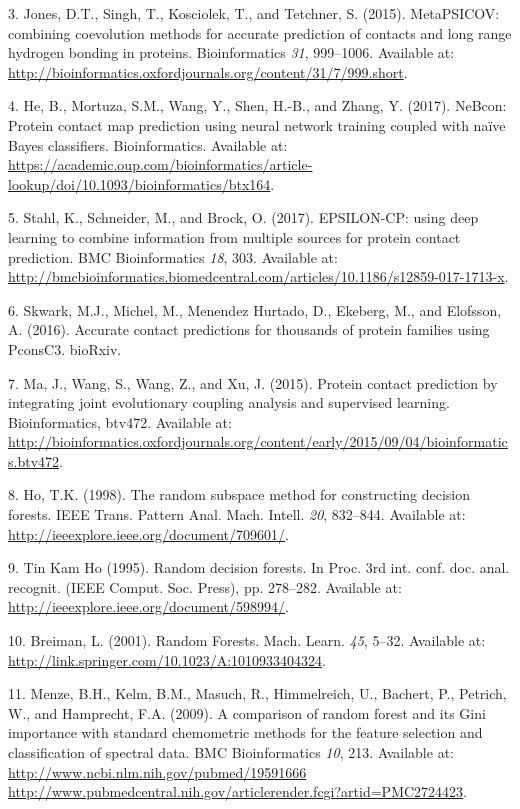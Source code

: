 \documentclass[12pt,a4paper,twoside]{book}
\theoremstyle{definition}
\theoremstyle{definition}
\theoremstyle{remark}
\begin{document}
\hypertarget{ref-Jones2015a}{}
3. Jones, D.T., Singh, T., Kosciolek, T., and Tetchner, S. (2015).
MetaPSICOV: combining coevolution methods for accurate prediction of
contacts and long range hydrogen bonding in proteins. Bioinformatics
\emph{31}, 999--1006. Available at:
\url{http://bioinformatics.oxfordjournals.org/content/31/7/999.short}.

\hypertarget{ref-He2017}{}
4. He, B., Mortuza, S.M., Wang, Y., Shen, H.-B., and Zhang, Y. (2017).
NeBcon: Protein contact map prediction using neural network training
coupled with naïve Bayes classifiers. Bioinformatics. Available at:
\url{https://academic.oup.com/bioinformatics/article-lookup/doi/10.1093/bioinformatics/btx164}.

\hypertarget{ref-Stahl2017}{}
5. Stahl, K., Schneider, M., and Brock, O. (2017). EPSILON-CP: using
deep learning to combine information from multiple sources for protein
contact prediction. BMC Bioinformatics \emph{18}, 303. Available at:
\url{http://bmcbioinformatics.biomedcentral.com/articles/10.1186/s12859-017-1713-x}.

\hypertarget{ref-Skwark2016}{}
6. Skwark, M.J., Michel, M., Menendez Hurtado, D., Ekeberg, M., and
Elofsson, A. (2016). Accurate contact predictions for thousands of
protein families using PconsC3. bioRxiv.

\hypertarget{ref-Ma2015a}{}
7. Ma, J., Wang, S., Wang, Z., and Xu, J. (2015). Protein contact
prediction by integrating joint evolutionary coupling analysis and
supervised learning. Bioinformatics, btv472. Available at:
\url{http://bioinformatics.oxfordjournals.org/content/early/2015/09/04/bioinformatics.btv472}.

\hypertarget{ref-Ho1998}{}
8. Ho, T.K. (1998). The random subspace method for constructing decision
forests. IEEE Trans. Pattern Anal. Mach. Intell. \emph{20}, 832--844.
Available at: \url{http://ieeexplore.ieee.org/document/709601/}.

\hypertarget{ref-TinKamHo}{}
9. Tin Kam Ho (1995). Random decision forests. In Proc. 3rd int. conf.
doc. anal. recognit. (IEEE Comput. Soc. Press), pp. 278--282. Available
at: \url{http://ieeexplore.ieee.org/document/598994/}.

\hypertarget{ref-Breiman2001}{}
10. Breiman, L. (2001). Random Forests. Mach. Learn. \emph{45}, 5--32.
Available at: \url{http://link.springer.com/10.1023/A:1010933404324}.

\hypertarget{ref-Menze2009}{}
11. Menze, B.H., Kelm, B.M., Masuch, R., Himmelreich, U., Bachert, P.,
Petrich, W., and Hamprecht, F.A. (2009). A comparison of random forest
and its Gini importance with standard chemometric methods for the
feature selection and classification of spectral data. BMC
Bioinformatics \emph{10}, 213. Available at:
\href{http://www.ncbi.nlm.nih.gov/pubmed/19591666\%20http://www.pubmedcentral.nih.gov/articlerender.fcgi?artid=PMC2724423}{http://www.ncbi.nlm.nih.gov/pubmed/19591666 http://www.pubmedcentral.nih.gov/articlerender.fcgi?artid=PMC2724423}.
\end{document}
